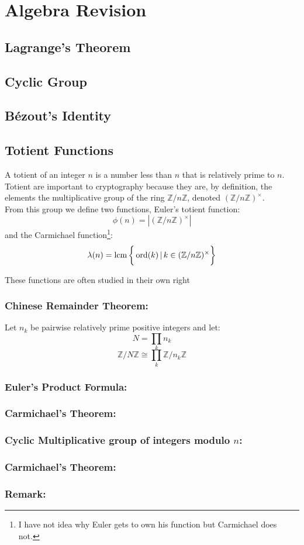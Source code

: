
\section{Algebra Revision}
\subsection{Lagrange's Theorem}
\subsection{Cyclic Group}
\subsection{Bézout's Identity}
\subsection{Totient Functions}
A totient of an integer $n$ is a number less than $n$ that is relatively prime to $n$.
Totient are important to cryptography because they are, by definition, the elements the multiplicative group of the ring $\mathbb{Z}/n\mathbb{Z}$,
denoted $(\mathbb{Z}/n\mathbb{Z})^\times$.
\\

From this group we define two functions,
Euler's totient function:
\[\phi(n) = |(\mathbb{Z}/n\mathbb{Z})^\times|\]
and the Carmichael function\footnote{I have not idea why Euler gets to own his function but Carmichael does not.}:
\[\lambda(n) = \operatorname{lcm}\bigg\{\operatorname{ord}(k)\,|\, k\in(\mathbb{Z}/n\mathbb{Z})^\times\bigg\}\]

These functions are often studied in their own right

\subsubsection{Chinese Remainder Theorem:}
Let $n_k$ be pairwise relatively prime positive integers and let:
\[N =\prod_k n_k \]
\[\mathbb{Z}/N\mathbb{Z} \cong \prod_k\mathbb{Z}/n_k\mathbb{Z}\]
\subsubsection{Euler's Product Formula:}
\subsubsection{Carmichael's Theorem:}
\subsubsection{Cyclic Multiplicative group of integers modulo $n$:}
\label{appx:cycle-multiplicative-group}
\subsubsection{Carmichael's Theorem:}
\subsubsection{Remark:}
